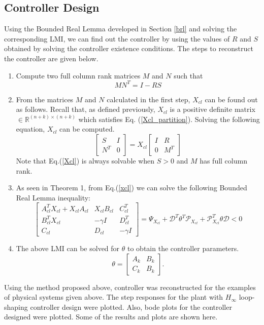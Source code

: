 \documentclass[a4paper,12pt]{article}
\begin{document}
	 \subsection{Controller Design}
	 Using the Bounded Real Lemma developed in Section \ref{brl} and solving the corresponding LMI, we can find out the controller by using the values of $R$ and $S$ obtained by solving the controller existence conditions. The steps to reconstruct the controller are given below.
	 \begin{enumerate}
	 \item Compute two full column rank matrices $M$ and $N$ such that
	 \begin{equation}
	 MN^{T} = I - RS
	 \end{equation}
	 \item From the matrices $M$ and $N$ calculated in the first step, $X_{cl}$ can be found out as follows. Recall that, as defined previously, $X_{cl}$ is a positive definite matrix $\in \mathbb{R}^{(n+k) \times (n+k)}$ which satisfies Eq. (\ref{Xcl_partition}). Solving the following equation, $X_{cl}$ can be computed.
	 \begin{equation}
	 \begin{bmatrix}
	 S & I \\ N^{T} & 0
	 \end{bmatrix}
	 =
	 X_{cl}\begin{bmatrix}
	 I & R \\
	 0 & M^{T}
	 \end{bmatrix}
	 \label{Xcl}
	 \end{equation}
	 Note that Eq.(\ref{Xcl}) is always solvable when $S>0$ and $M$ has full column rank. 
	\item As seen in Theorem 1, from Eq.(\ref{xcl}) we can solve the following Bounded Real Lemma inequality:
	\begin{equation}
		\begin{bmatrix}
			A_{cl}^{T}X_{cl}+X_{cl}A_{cl} & X_{cl}B_{cl} & C_{cl}^{T} \\
			B_{cl}^{T}X_{cl} & -\gamma I & D_{cl}^{T} \\
			C_{cl} & D_{cl} & -\gamma I
		\end{bmatrix}
		=\Psi_{X_{cl}} + \mathscr{D}^{T}\theta^{T}\mathscr{P}_{X_{cl}}+\mathscr{P}_{X_{cl}}^{T}\theta\mathscr{D} <0
		\end{equation}
	\item The above LMI can be solved for $\theta$ to obtain the controller parameters. 
	\begin{equation}
	\theta = \begin{bmatrix}
	A_{k} & B_{k} \\
	C_{k} & B_{k}
	\end{bmatrix}.
	\end{equation}
	 \end{enumerate}
	 Using the method proposed above, controller was reconstructed for the examples of physical systems given above. The step responses for the plant with $H_{\infty}$ loop-shaping controller design were plotted. Also, bode plots for the controller designed were plotted. Some of the results and plots are shown here.
	 
\end{document}
